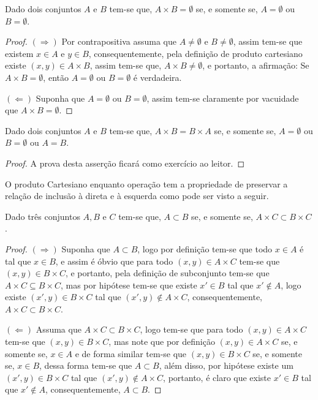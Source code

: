 \begin{teorema}\label{teo:AbsorcaoCatersiano}
	Dado dois conjuntos $A$ e $B$ tem-se que, $A \times B = \emptyset$ se, e somente se, $A = \emptyset$ ou $B = \emptyset$.
\end{teorema}

\begin{proof}
	$(\Rightarrow)$ Por contrapositiva assuma que $A \neq \emptyset$ e $B \neq \emptyset$, assim tem-se que existem $x \in A$ e $y \in B$, consequentemente, pela definição de produto cartesiano existe $(x,y) \in A \times B$, assim tem-se que, $A \times B \neq \emptyset$, e portanto, a afirmação: Se $A \times B = \emptyset$, então $A = \emptyset$ ou $B = \emptyset$ é verdadeira.
	
	$(\Leftarrow)$ Suponha que $A = \emptyset$ ou $B = \emptyset$, assim tem-se claramente por vacuidade que $A \times B = \emptyset$.
\end{proof}

\begin{teorema}\label{teo:IgualdadeCartesiano}
	Dado dois conjuntos $A$ e $B$ tem-se que, $A \times B = B \times A$ se, e somente se, $A = \emptyset$ ou $B = \emptyset$ ou $A = B$.
\end{teorema}

\begin{proof}
	A prova desta asserção ficará como exercício ao leitor.
\end{proof}

O produto Cartesiano enquanto operação tem a propriedade de preservar a relação de inclusão à direta e à esquerda como pode ser visto a seguir. 

\begin{teorema}\label{teo:CartesianoMonoDireita}
	Dado três conjuntos $A, B$ e $C$ tem-se que, $A \subset B$ se, e somente se, $A \times C \subset B \times C$.
\end{teorema}

\begin{proof}
	$(\Rightarrow)$ Suponha que $A \subset B$, logo por definição tem-se que todo $x \in A$ é tal que $x \in B$, e assim é óbvio que para todo $(x,y) \in A \times C$ tem-se que $(x, y) \in B \times C$, e portanto, pela definição de subconjunto tem-se que $A \times C \subseteq B \times C$, mas por hipótese tem-se que existe $x' \in B$ tal que $x' \notin A$, logo existe $(x', y) \in B \times C$ tal que $(x', y) \notin A \times C$, consequentemente, $A \times C \subset B \times C$.
	
	$(\Leftarrow)$ Assuma que $A \times C \subset B \times C$, logo tem-se que para todo $(x, y) \in A \times C$ tem-se que $(x, y) \in B \times C$, mas note que por definição $(x, y) \in A \times C$ se, e somente se, $x \in A$ e de forma similar tem-se que $(x, y) \in B \times C$ se, e somente se, $x \in B$, dessa forma tem-se que $A \subset B$, além disso, por hipótese existe um $(x', y) \in B \times C$ tal que $(x', y) \notin A \times C$, portanto, é claro que existe $x' \in B$ tal que $x' \notin A$, consequentemente, $A \subset B$.
\end{proof}

